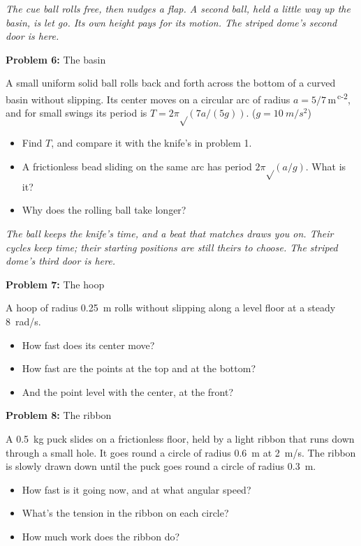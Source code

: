 \documentclass[11pt]{article}
\newcommand{\room}[1]{\par\bigskip{\large\bfseries #1}\par\nopagebreak\smallskip}
\newcommand{\scene}[1]{\par{\itshape #1}\par}
\newcommand{\problem}[2]{\par\medskip\textbf{Problem #1:} #2\par\nopagebreak}
\newenvironment{parts}{\begin{itemize}[leftmargin=3.4em,labelwidth=2.8em,labelsep=0.6em,align=left,itemsep=3pt,topsep=4pt]}{\end{itemize}}
\newcommand{\pt}[1]{\item[\textbf{#1}]}
\newcommand{\sv}[1]{\textsuperscript{\dag\,#1}}
\newcommand{\rt}{\text{√}}  %
\begin{document}
\room{Conservatory}
\scene{The cue ball rolls free, then nudges a flap. A second ball, held a little way up the basin, is let go. Its own height pays for its motion. The striped dome's second door is here.}
\problem{6}{The basin}
A small uniform solid ball rolls back and forth across the bottom of a curved basin without slipping. Its center moves on a circular arc of radius $a = 5/7$\,m\sv{c-2}, and for small swings its period is $T = 2\pi\rt(7a/(5g))$. ($g = \SI{10}{m/s^2}$)
\begin{parts}
\pt{6-a} Find $T$, and compare it with the knife's in problem 1.
\pt{6-b} A frictionless bead sliding on the same arc has period $2\pi\rt(a/g)$. What is it?
\pt{6-c} Why does the rolling ball take longer?
\end{parts}

\clearpage
\room{Ballroom}
\scene{The ball keeps the knife's time, and a beat that matches draws you on. Their cycles keep time; their starting positions are still theirs to choose. The striped dome's third door is here.}
\problem{7}{The hoop}
A hoop of radius \SI{0.25}{m} rolls without slipping along a level floor at a steady \SI{8}{rad/s}.
\begin{parts}
\pt{7-a} How fast does its center move?
\pt{7-b} How fast are the points at the top and at the bottom?
\pt{7-c} And the point level with the center, at the front?
\end{parts}

\problem{8}{The ribbon}
A \SI{0.5}{kg} puck slides on a frictionless floor, held by a light ribbon that runs down through a small hole. It goes round a circle of radius \SI{0.6}{m} at \SI{2}{m/s}. The ribbon is slowly drawn down until the puck goes round a circle of radius \SI{0.3}{m}.
\begin{parts}
\pt{8-a} How fast is it going now, and at what angular speed?
\pt{8-b} What's the tension in the ribbon on each circle?
\pt{8-c} How much work does the ribbon do?
\end{parts}
\end{document}
